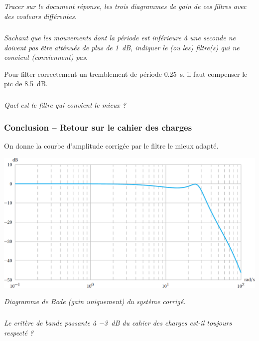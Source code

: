 \documentclass[10pt,fleqn]{article} %
\begin{document}
\subparagraph{}\textit{Tracer sur le document réponse, les trois diagrammes de gain de ces filtres avec des couleurs différentes.}

\subparagraph{}\textit{Sachant que les mouvements dont la période est inférieure à une seconde ne doivent pas être atténués de plus de \SI{1}{dB},
	indiquer le (ou les) filtre(s) qui ne convient (conviennent) pas.}

Pour filter correctement un tremblement de période \SI{0,25}{s}, il faut compenser le pic de \SI{8,5}{dB}.

\subparagraph{}\textit{Quel est le filtre qui convient le mieux ?}





\subsubsection*{Conclusion  -- Retour sur le cahier des charges}
On donne la courbe d'amplitude corrigée par le filtre le mieux adapté.

\begin{center}
	\includegraphics[width=14cm]{images2/bode_3}

\textit{Diagramme de Bode (gain uniquement) du système corrigé.}
\end{center}


\subparagraph{}
\textit{Le critère de bande passante à \SI{-3}{dB} du cahier des charges est-il toujours respecté ?}
\end{document}
